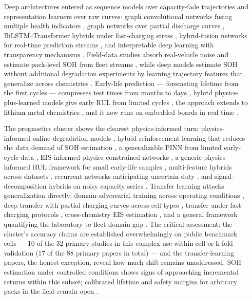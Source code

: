 \documentclass[journal]{IEEEtran}
\begin{document}
Deep architectures entered as sequence models over capacity-fade trajectories and representation learners over raw curves: graph convolutional networks fusing multiple health indicators \cite{r7}, graph networks over partial discharge curves \cite{r50}, BiLSTM--Transformer hybrids under fast-charging stress \cite{r8}, hybrid-fusion networks for real-time prediction streams \cite{r51}, and interpretable deep learning with transparency mechanisms \cite{r52}. Field-data studies absorb real-vehicle noise \cite{r6} and estimate pack-level SOH from fleet streams \cite{r53}, while deep models estimate SOH without additional degradation experiments by learning trajectory features that generalize across chemistries \cite{r54}. Early-life prediction --- forecasting lifetime from the first cycles --- compresses test times from months to days \cite{r3}\cite{r55}\cite{r56}, hybrid physics-plus-learned models give early RUL from limited cycles \cite{r57}, the approach extends to lithium-metal chemistries \cite{r58}, and it now runs on embedded boards in real time \cite{r59}.

The prognostics cluster shows the clearest physics-informed turn: physics-informed online degradation models \cite{r60}, hybrid reinforcement learning that reduces the data demand of SOH estimation \cite{r28}, a generalizable PINN from limited early-cycle data \cite{r61}, EIS-informed physics-constrained networks \cite{r62}, a generic physics-informed RUL framework for small early-life samples \cite{r63}, multi-feature hybrids across datasets \cite{r64}, recurrent networks anticipating uncertain duty \cite{r65}, and signal-decomposition hybrids on noisy capacity series \cite{r66}. Transfer learning attacks generalization directly: domain-adversarial training across operating conditions \cite{r11}, deep transfer with partial charging curves across cell types \cite{r12}, transfer under fast-charging protocols \cite{r67}, cross-chemistry EIS estimation \cite{r68}, and a general framework quantifying the laboratory-to-fleet domain gap \cite{r69}. The critical assessment: the cluster's accuracy claims are established overwhelmingly on public benchmark cells --- 10 of the 32 primary studies in this complex use within-cell or k-fold validation (17 of the 88 primary papers in total) --- and the transfer-learning papers, the honest exception, reveal how much shift remains unaddressed. SOH estimation under controlled conditions shows signs of approaching incremental returns within this subset; calibrated lifetime and safety margins for arbitrary packs in the field remain open \cite{r2}\cite{r20}.
\end{document}

